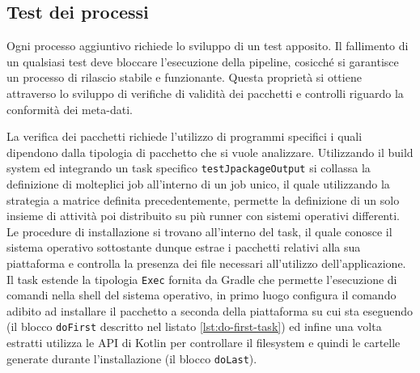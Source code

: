 \subsection{Test dei processi}

Ogni processo aggiuntivo richiede lo sviluppo di un test apposito. Il fallimento di un qualsiasi test deve bloccare l'esecuzione della pipeline, cosicché si garantisce un processo di rilascio stabile e funzionante. Questa proprietà si ottiene attraverso lo sviluppo di verifiche di validità dei pacchetti e controlli riguardo la conformità dei meta-dati.

La verifica dei pacchetti richiede l'utilizzo di programmi specifici i quali dipendono dalla tipologia di pacchetto che si vuole analizzare. Utilizzando il build system ed integrando un task specifico \texttt{testJpackageOutput} si collassa la definizione di molteplici job all'interno di un job unico, il quale utilizzando la strategia a matrice definita precedentemente, permette la definizione di un solo insieme di attività poi distribuito su più runner con sistemi operativi differenti. Le procedure di installazione si trovano all'interno del task, il quale conosce il sistema operativo sottostante dunque estrae i pacchetti relativi alla sua piattaforma e controlla la presenza dei file necessari all'utilizzo dell'applicazione. Il task estende la tipologia \texttt{Exec} fornita da Gradle che permette l'esecuzione di comandi nella shell del sistema operativo, in primo luogo configura il comando adibito ad installare il pacchetto a seconda della piattaforma su cui sta eseguendo (il blocco \texttt{doFirst} descritto nel listato \ref{lst:do-first-task}) ed infine una volta estratti utilizza le API di Kotlin per controllare il filesystem e quindi le cartelle generate durante l'installazione (il blocco \texttt{doLast}).



